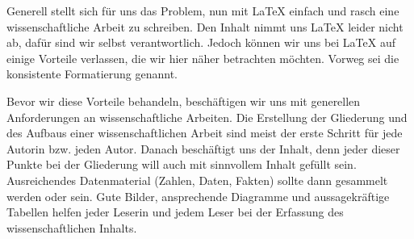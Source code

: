 %
Generell stellt sich für uns das Problem, nun mit \LaTeX{} einfach und rasch eine wissenschaftliche Arbeit zu schreiben.
Den Inhalt nimmt uns \LaTeX{} leider nicht ab, dafür sind wir selbst verantwortlich.
Jedoch können wir uns bei \LaTeX{} auf einige Vorteile verlassen, die wir hier näher betrachten möchten.
Vorweg sei die konsistente Formatierung genannt.

Bevor wir diese Vorteile behandeln, beschäftigen wir uns mit generellen Anforderungen an wissenschaftliche Arbeiten.
Die Erstellung der Gliederung und des Aufbaus einer wissenschaftlichen Arbeit sind meist der erste Schritt für jede Autorin bzw. jeden Autor.
Danach beschäftigt uns der Inhalt, denn jeder dieser Punkte bei der Gliederung will auch mit sinnvollem Inhalt gefüllt sein.
Ausreichendes Datenmaterial (Zahlen, Daten, Fakten) sollte dann gesammelt werden oder sein.
Gute Bilder, ansprechende Diagramme und aussagekräftige Tabellen helfen jeder Leserin und jedem Leser bei der Erfassung des wissenschaftlichen Inhalts.

